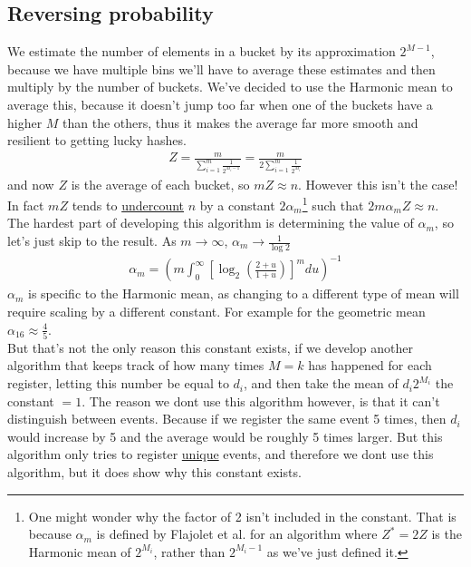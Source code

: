 \subsection{Reversing probability}
We estimate the number of elements in a bucket by its approximation $2^{M-1}$, because we have multiple bins we'll have to average these estimates and then multiply by the number of buckets. We've decided to use the Harmonic mean to average this, because it doesn't jump too far when one of the buckets have a higher $M$ than the others, thus it makes the average far more smooth and resilient to getting lucky hashes.
\begin{equation*}
    \begin{split}
        Z=\frac{m}{\displaystyle\sum_{i=1}^m \frac{1}{2^{M_i-1}}}=\frac{m}{2\displaystyle\sum_{i=1}^m \frac{1}{2^{M_i}}}
    \end{split}
\end{equation*}
and now $Z$ is the average of each bucket, so $mZ\approx n$. However this isn't the case! In fact $mZ$ tends to \underline{undercount} $n$ by a constant $2\alpha_m$\footnote{One might wonder why the factor of 2 isn't included in the constant. That is because $\alpha_m$ is defined by Flajolet et al. for an algorithm where $Z^*=2Z$ is the Harmonic mean of $2^{M_i}$, rather than $2^{M_i-1}$ as we've just defined it. } such that $2m\alpha_m Z\approx n$. The hardest part of developing this algorithm is determining the value of $\alpha_m$, so let's just skip to the result. As $m\rightarrow\infty$, $\alpha_m\rightarrow\frac{1}{\log 2}$
\begin{equation*}
    \begin{split}
        \alpha_m=\left(m\int_0^\infty \left[\log_2\left(\frac{2+u}{1+u}\right)\right]^mdu\right)^{-1}
    \end{split}
\end{equation*}
$\alpha_m$ is specific to the Harmonic mean, as changing to a different type of mean will require scaling by a different constant. For example for the geometric mean $\alpha_{16}\approx \frac{4}{5}$.\\
But that's not the only reason this constant exists, if we develop another algorithm that keeps track of how many times $M=k$ has happened for each register, letting this number be equal to $d_i$, and then take the mean of $d_i 2^{M_i}$ the constant $=1$. The reason we dont use this algorithm however, is that it can't distinguish between events. Because if we register the same event 5 times, then $d_i$ would increase by 5 and the average would be roughly 5 times larger. But this algorithm only tries to register \underline{unique} events, and therefore we dont use this algorithm, but it does show why this constant exists.
